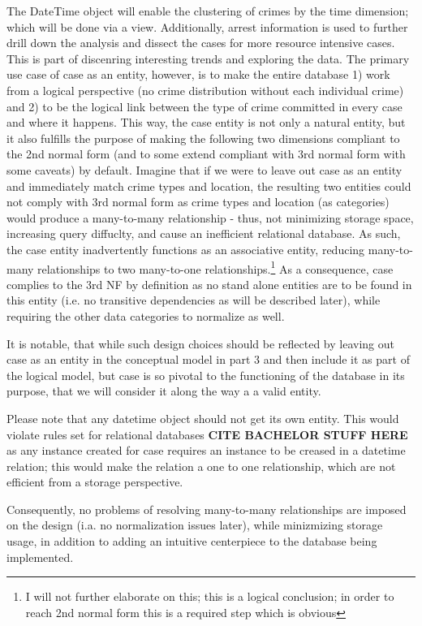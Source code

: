 \documentclass[a4paper]{article}
\begin{document}
The DateTime object will enable the clustering of crimes by the time dimension; which will be done via a view. Additionally, arrest information is used to further drill down the analysis and dissect the cases for more resource intensive cases. This is part of discenring interesting trends and exploring the data. The primary use case of case as an entity, however, is to make the entire database 1) work from a logical perspective (no crime distribution without each individual crime) and 2) to be the logical link between the type of crime committed in every case and where it happens. This way, the case entity is not only a natural entity, but it also fulfills the purpose of making the following two dimensions compliant to the 2nd normal form (and to some extend compliant with 3rd normal form with some caveats) by default. Imagine that if we were to leave out case as an entity and immediately match crime types and location, the resulting two entities could not comply with 3rd normal form as crime types and location (as categories) would produce a many-to-many relationship - thus, not minimizing storage space, increasing query diffuclty, and cause an inefficient relational database. As such, the case entity inadvertently functions as an associative entity, reducing many-to-many relationships to two many-to-one relationships.\footnote{I will not further elaborate on this; this is a logical conclusion; in order to reach 2nd normal form this is a required step which is obvious} As a consequence, case complies to the 3rd NF by definition as no stand alone entities are to be found in this entity (i.e. no transitive dependencies as will be described later), while requiring the other data categories to normalize as well.

 It is notable, that while such design choices should be reflected by leaving out case as an entity in the conceptual model in part 3 and then include it as part of the logical model, but case is so pivotal to the functioning of the database in its purpose, that we will consider it along the way a a valid entity.
 
Please note that any datetime object should not get its own entity. This would violate rules set for relational databases \textbf{CITE BACHELOR STUFF HERE} as any instance created for case requires an instance to be creased in a datetime relation; this would make the relation a one to one relationship, which are not efficient from a storage perspective. 
 
Consequently, no problems of resolving many-to-many relationships are imposed on the design (i.a. no normalization issues later), while minizmizing storage usage, in addition to adding an intuitive centerpiece to the database being implemented.  
 
\end{document}
